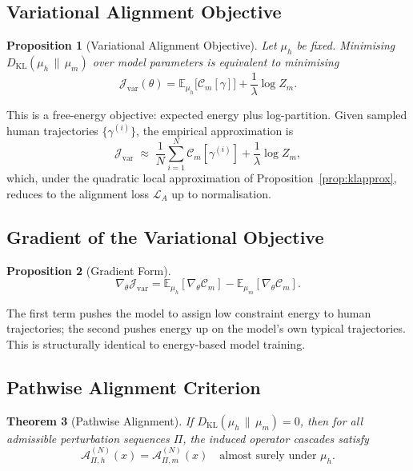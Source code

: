 \documentclass[12pt, a4paper]{article}
\newtheorem{theorem}{Theorem}[section]
\newtheorem{proposition}[theorem]{Proposition}
\theoremstyle{remark}
\theoremstyle{definition}
\begin{document}
\subsection{Variational Alignment Objective}

\begin{proposition}[Variational Alignment Objective]
\label{prop:variational}
Let $\mu_h$ be fixed.  Minimising $D_{\mathrm{KL}}(\mu_h\,\|\,\mu_m)$ over model
parameters is equivalent to minimising
\[
\mathcal{J}_{\mathrm{var}}(\theta)
= \mathbb{E}_{\mu_h}\bigl[\mathcal{C}_m[\gamma]\bigr]
+ \frac{1}{\lambda}\log Z_m.
\]
\end{proposition}

This is a free-energy objective: expected energy plus log-partition.  Given sampled human
trajectories $\{\gamma^{(i)}\}$, the empirical approximation is
\[
\mathcal{J}_{\mathrm{var}} \;\approx\;
\frac{1}{N}\sum_{i=1}^N \mathcal{C}_m[\gamma^{(i)}]
+ \frac{1}{\lambda}\log Z_m,
\]
which, under the quadratic local approximation of Proposition~\ref{prop:klapprox},
reduces to the alignment loss $\mathcal{L}_A$ up to normalisation.

\subsection{Gradient of the Variational Objective}

\begin{proposition}[Gradient Form]
\label{prop:gradient}
\[
\nabla_\theta \mathcal{J}_{\mathrm{var}}
= \mathbb{E}_{\mu_h}[\nabla_\theta \mathcal{C}_m]
- \mathbb{E}_{\mu_m}[\nabla_\theta \mathcal{C}_m].
\]
\end{proposition}

The first term pushes the model to assign low constraint energy to human trajectories; the
second pushes energy up on the model's own typical trajectories.  This is structurally
identical to energy-based model training.

\subsection{Pathwise Alignment Criterion}

\begin{theorem}[Pathwise Alignment]
\label{thm:pathwise}
If $D_{\mathrm{KL}}(\mu_h\,\|\,\mu_m) = 0$, then for all admissible perturbation
sequences $\Pi$, the induced operator cascades satisfy
\[
\mathcal{A}^{(N)}_{\Pi,h}(x) = \mathcal{A}^{(N)}_{\Pi,m}(x)
\quad \text{almost surely under } \mu_h.
\]
\end{theorem}
\end{document}
